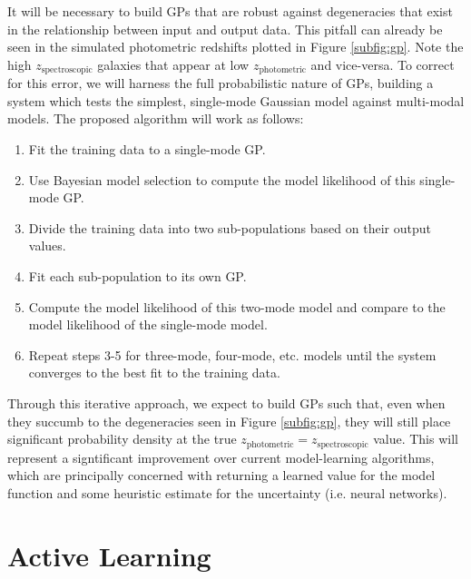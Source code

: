 \documentclass[prd,nofootbib,floatfix,11pt,tightenlines,nofootinbib]{revtex4}
\begin{document}
It will be necessary to build GPs that are robust against degeneracies
that exist in the relationship between input and output
data.  This pitfall can already be seen in the simulated photometric redshifts
plotted in Figure \ref{subfig:gp}.  Note the high
$z_\text{spectroscopic}$ galaxies that appear at low $z_\text{photometric}$ and
vice-versa.  To correct for this error, we will harness the full probabilistic
nature of GPs, building a system which tests the simplest, single-mode Gaussian
model against multi-modal models.  The proposed algorithm will work as
follows:
\vspace{.5\baselineskip}
\begin{enumerate}
\item Fit the training data to a single-mode GP.

\item Use Bayesian model selection \cite{mackay}
to compute the model likelihood of this single-mode GP.

\item Divide the training data into two sub-populations based on their output
values.

\item Fit each sub-population to its own GP.

\item Compute the model likelihood of this two-mode model and compare to the
model likelihood of the single-mode model.

\item Repeat steps 3-5 for three-mode, four-mode, etc. models until
  the system converges to the best fit to the training data.
\end{enumerate}

\vspace{.5\baselineskip}
Through this iterative approach, we expect to build  GPs such that, even when 
they
succumb to the degeneracies seen in Figure \ref{subfig:gp}, 
they will still place
significant probability density at the true
$z_\text{photometric}=z_\text{spectroscopic}$ value.  This will represent a
signtificant improvement over current model-learning algorithms, which are
principally concerned with returning a learned value for the model function and
some heuristic estimate for the uncertainty (i.e. neural networks).

\section{Active Learning}
\label{sec:active_learning}
\end{document}
